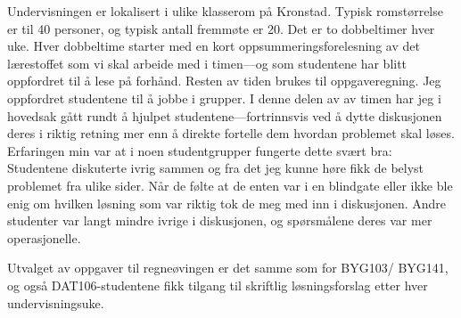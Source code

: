 \documentclass[a4paper,norsk,12pt]{article}
\begin{document}
Undervisningen er lokalisert i ulike klasserom på Kronstad. Typisk rom\-størrelse er til 40 personer, og typisk antall fremmøte er 20. Det er to dobbeltimer hver uke. Hver dobbeltime starter med en kort oppsummeringsforelesning av det lærestoffet som vi skal arbeide med i timen---og som studentene har blitt oppfordret til å lese på forhånd. Resten av tiden brukes til oppgaveregning. Jeg oppfordret studentene til å jobbe i grupper. I denne delen av av timen har jeg i hovedsak gått rundt å hjulpet studentene---fortrinnsvis ved å dytte diskusjonen deres i riktig retning mer enn å direkte fortelle dem hvordan problemet skal løses. Erfaringen min var at i noen studentgrupper fungerte dette svært bra: Studentene diskuterte ivrig sammen og fra det jeg kunne høre fikk de belyst problemet fra ulike sider. Når de følte at de enten var i en blindgate eller ikke ble enig om hvilken løsning som var riktig tok de meg med inn i diskusjonen. Andre studenter var langt mindre ivrige i diskusjonen, og spørsmålene deres var mer operasjonelle.

Utvalget av oppgaver til regneøvingen er det samme som for BYG103/ BYG141, og også DAT106-studentene fikk tilgang til skriftlig løsningsforslag etter hver undervisningsuke. 
\end{document}
